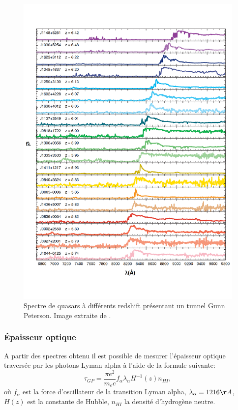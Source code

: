 \begin{figure}
        \includegraphics[width=.95\linewidth]{img/01/quasar_spectre.pdf} 
        \caption[Spectre de quasars]{Spectre de quasars à différents redshift présentant un tunnel Gunn Peterson.
		Image extraite de \cite{fan_constraining_2006}.}
 		\label{fig:spectre_quasar}
\end{figure}

\subsubsection{Épaisseur optique}

A partir des spectres obtenu il est possible de mesurer l’épaisseur optique traversée par les photons Lyman alpha à l'aide de la formule suivante:
\begin{equation}
\tau_{GP} = \frac{\pi e^2}{m_e c} f_\alpha \lambda_\alpha H^{-1}(z) n_{HI},
\end{equation}
où $f_\alpha$ est la force d'oscillateur de la transition Lyman alpha, $\lambda_\alpha = 1216 \AA$, $H(z)$ est la constante de Hubble, $n_{HI}$ la densité d'hydrogène neutre.

